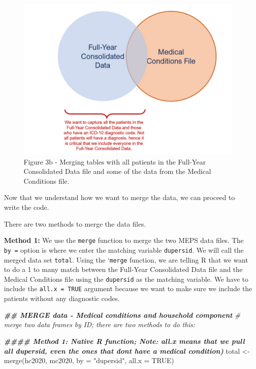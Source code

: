 \documentclass[
]{book}
\newenvironment{Shaded}{\begin{snugshade}}{\end{snugshade}}
\newcommand{\AttributeTok}[1]{\textcolor[rgb]{0.77,0.63,0.00}{#1}}
\newcommand{\CommentTok}[1]{\textcolor[rgb]{0.56,0.35,0.01}{\textit{#1}}}
\newcommand{\ConstantTok}[1]{\textcolor[rgb]{0.00,0.00,0.00}{#1}}
\newcommand{\DocumentationTok}[1]{\textcolor[rgb]{0.56,0.35,0.01}{\textbf{\textit{#1}}}}
\newcommand{\FunctionTok}[1]{\textcolor[rgb]{0.00,0.00,0.00}{#1}}
\newcommand{\NormalTok}[1]{#1}
\newcommand{\OtherTok}[1]{\textcolor[rgb]{0.56,0.35,0.01}{#1}}
\newcommand{\StringTok}[1]{\textcolor[rgb]{0.31,0.60,0.02}{#1}}
\theoremstyle{definition}
\theoremstyle{definition}
\theoremstyle{definition}
\theoremstyle{definition}
\theoremstyle{remark}
\begin{document}
\begin{figure}
\includegraphics[width=1\linewidth]{Figure 2_3b} \caption{Figure 3b - Merging tables with all patients in the Full-Year Consolidated Data file and some of the data from the Medical Conditions file.}\label{fig:unnamed-chunk-12}
\end{figure}

Now that we understand how we want to merge the data, we can proceed to write the code.

There are two methods to merge the data files.

\textbf{Method 1:} We use the \texttt{merge} function to merge the two MEPS data files. The \texttt{by\ =} option is where we enter the matching variable \texttt{dupersid}. We will call the merged data set \texttt{total}. Using the `\texttt{merge} function, we are telling R that we want to do a 1 to many match between the Full-Year Consolidated Data file and the Medical Conditions file using the \texttt{dupersid} as the matching variable. We have to include the \texttt{all.x\ =\ TRUE} argument because we want to make sure we include the patients without any diagnostic codes.

\begin{Shaded}
\begin{Highlighting}[]
\DocumentationTok{\#\# MERGE data {-} Medical conditions and household component}
\CommentTok{\# merge two data frames by ID; there are two methods to do this:}

\DocumentationTok{\#\#\#\# Method 1: Native R function; Note: all.x means that we pull all dupersid, even the ones that don\textquotesingle{}t have a medical condition)}
\NormalTok{total }\OtherTok{\textless{}{-}} \FunctionTok{merge}\NormalTok{(hc2020, mc2020, }\AttributeTok{by =} \StringTok{"dupersid"}\NormalTok{, }\AttributeTok{all.x =} \ConstantTok{TRUE}\NormalTok{)}
\end{Highlighting}
\end{Shaded}
\end{document}
